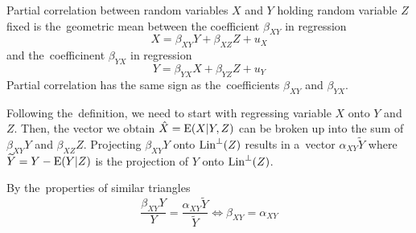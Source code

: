 
\begin{definition}
Partial correlation between random variables $X$ and $Y$ holding random variable $Z$
fixed is the~geometric mean between the coefficient $\beta_{XY}$ in regression
\[
X = \beta_{XY} Y + \beta_{XZ} Z + u_X
\]
and the~coefficinent $\beta_{YX}$ in regression
\[
Y = \beta_{YX} X + \beta_{YZ} Z + u_Y
\]
Partial correlation has the same sign as the~coefficients $\beta_{XY}$ and $\beta_{YX}$.
\end{definition}

Following the~definition, we need to start with regressing variable $X$ onto
$Y$ and $Z$. Then, the vector we obtain $\hat X = \operatorname{E}(X \vert Y, Z)$
can be broken up into the sum of $\beta_{XY} Y$ and $\beta_{XZ} Z$.
Projecting $\beta_{XY} Y$ onto $\operatorname{Lin}^{\perp}(Z)$ results in a~vector
$\alpha_{XY} \widetilde Y$ where $\widetilde Y = Y - \operatorname{E}(Y \vert Z)$
is the projection of $Y$ onto $\operatorname{Lin}^{\perp}(Z)$.


By the~properties of similar triangles
\[
\frac{\beta_{XY} Y}{Y} = \frac{\alpha_{XY} \widetilde Y}{\widetilde Y} \Leftrightarrow \beta_{XY} = \alpha_{XY}
\]

